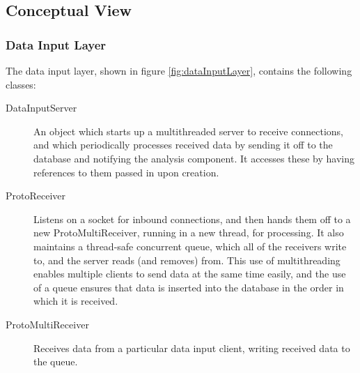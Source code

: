 \documentclass[10pt,a4paper]{article}
\begin{document}

\subsection{Conceptual View}

\subsubsection{Data Input Layer}

The data input layer, shown in figure \ref{fig:dataInputLayer},
contains the following classes:

\begin{description}
  \item[DataInputServer] An object which starts up a multithreaded
    server to receive connections, and which periodically processes
    received data by sending it off to the database and notifying the
    analysis component. It accesses these by having references to them
    passed in upon creation.

  \item[ProtoReceiver] Listens on a socket for inbound connections,
    and then hands them off to a new ProtoMultiReceiver, running in a
    new thread, for processing. It also maintains a thread-safe
    concurrent queue, which all of the receivers write to, and the
    server reads (and removes) from. This use of multithreading
    enables multiple clients to send data at the same time easily, and
    the use of a queue ensures that data is inserted into the database
    in the order in which it is received.

  \item[ProtoMultiReceiver] Receives data from a particular data input
    client, writing received data to the queue.
\end{description}
\end{document}
